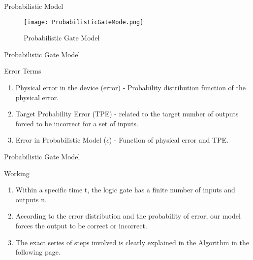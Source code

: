 \documentclass{beamer}
\begin{document}
\begin{frame}{Probabilistic Model}
\begin{figure}
    \centering
    \texttt{[image: ProbabilisticGateMode.png]}
    \caption{Probabilistic Gate Model}
    \label{fig:my_label}
\end{figure}
\end{frame}

\begin{frame}{Probabilistic Gate Model}
    \begin{block}{Error Terms}
    \begin{enumerate}
        \item Physical error in the device (error) - Probability distribution function of the physical error.
        \item Target Probability Error (TPE) - related to the target number of outputs forced to be incorrect for a set of inputs. 
        \item Error in Probabilistic Model ($\epsilon$) - Function of physical error and TPE.
    \end{enumerate}
    \end{block}
\end{frame}

\begin{frame}{Probabilistic Gate Model}
    \begin{block}{Working}
    \begin{enumerate}
        \item Within a specific time t, the logic gate has a finite number of inputs and outputs n. 
        \item According to the error distribution and the probability of error, our model forces the output to be correct or incorrect.
        \item The exact series of steps involved is clearly explained in the Algorithm in the following page.
    \end{enumerate}
    \end{block}
\end{frame}
\end{document}
